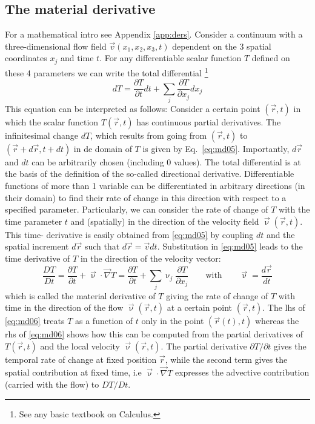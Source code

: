 \subsection{The material derivative}

For a mathematical intro see Appendix \ref{app:ders}.
Consider a continuum with a three-dimensional flow 
field $\vec{v}(x_1,x_2,x_3,t)$ dependent on
the 3 spatial coordinates $x_j$ and time $t$. 
For any differentiable scalar function $T$ defined on
these 4 parameters we can write the total differential
\footnote{See any basic textbook on Calculus.}
\begin{equation}
dT = \frac{\partial T}{\partial t} dt + 
\sum_j \frac{\partial T}{\partial x_j} dx_j
\label{eq:md05}
\end{equation}
This equation can be interpreted as follows: 
Consider a certain point $(\vec{r}, t)$ in which the
scalar function $T(\vec{r}, t)$ has continuous partial 
derivatives. The infinitesimal change $dT$,
which results from going 
from $(\vec{r}, t)$ to 
$(\vec{r} + d\vec{r}, t + dt)$ in de domain of $T$ 
is given by Eq.~\eqref{eq:md05}. 
Importantly, $d\vec{r}$ and $dt$ can be arbitrarily 
chosen (including 0 values). The total
differential is at the basis of the definition of 
the so-called directional derivative.
Differentiable functions of more than 1 variable 
can be differentiated in arbitrary
directions (in their domain) to find their rate of change 
in this direction with respect to a
specified parameter. Particularly, we can consider the 
rate of change of $T$ with the time
parameter $t$ and (spatially) in the direction of 
the velocity field $\vec{\upnu}(\vec{r}, t)$. This time-
derivative is easily obtained from \eqref{eq:md05}
by coupling $dt$ and the spatial increment $d\vec{r}$ such
that $d\vec{r} = \vec{v}dt$. 
Substitution in \eqref{eq:md05} leads to the time 
derivative of $T$ in the direction of the
velocity vector:
\begin{equation}
\frac{DT}{Dt} = 
\frac{\partial T}{\partial t} 
+\vec{\upnu} \cdot \vec\nabla T
=
\frac{\partial T}{\partial t} 
+\sum_j \upnu_j \frac{\partial T}{\partial x_j} 
\qquad
\text{with}
\qquad
\vec{\upnu} =\frac{d \vec{r}}{dt}
\label{eq:md06}
\end{equation}
which is called the material derivative of $T$ 
giving the rate of change of $T$ with time in
the direction of the flow $\vec{\upnu}(\vec{r},t)$ 
at a certain point $(\vec{r}, t)$. 
The lhs of \eqref{eq:md06} treats $T$ as a
function of $t$ only in the point $(\vec{r}(t), t)$ 
whereas the rhs of \eqref{eq:md06} shows how this can be
computed from the partial derivatives of $T(\vec{r}, t)$
and the local velocity $\vec{\upnu}(\vec{r}, t)$. The partial
derivative $\partial T/\partial t$
gives the temporal rate of change at fixed position 
$\vec{r}$, while the second term
gives the spatial contribution at fixed time, i.e
$\vec{\upnu} \cdot \vec\nabla T$
expresses the advective contribution
(carried with the flow) to $DT/Dt$.

